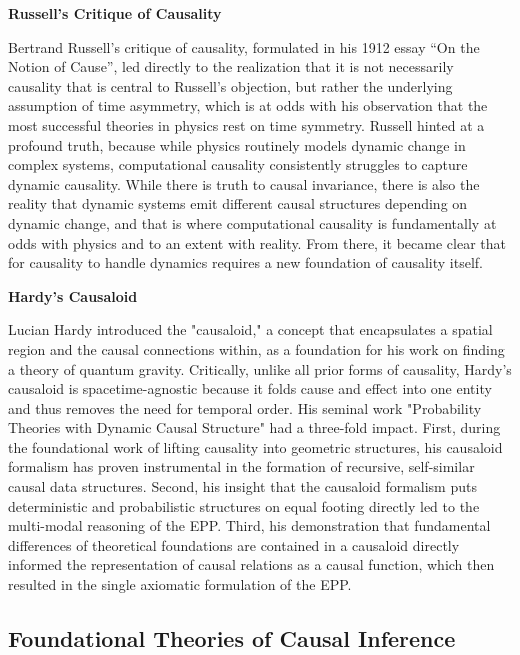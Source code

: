\textbf{Russell's Critique of Causality}

Bertrand Russell's critique of causality, formulated in his 1912 essay ``On the Notion of Cause''\cite{RussellOnCause}, led directly to the realization that it is not necessarily causality that is central to Russell's objection, but rather the underlying assumption of time asymmetry, which is at odds with his observation that the most successful theories in physics rest on time symmetry. Russell hinted at a profound truth, because while physics routinely models dynamic change in complex systems, computational causality consistently struggles to capture dynamic causality. While there is truth to causal invariance, there is also the reality that dynamic systems emit different causal structures depending on dynamic change, and that is where computational causality is fundamentally at odds with physics and to an extent with reality. From there, it became clear that for causality to handle dynamics requires a new foundation of causality itself.

\textbf{Hardy's Causaloid}

Lucian Hardy introduced the "causaloid,"\cite{HardyDynamicCausalStructure} a concept that encapsulates a spatial region and the causal connections within,
as a foundation for his work on finding a theory of quantum gravity. Critically, unlike all prior forms of causality,
Hardy's causaloid is spacetime-agnostic because it folds cause and effect into one entity and thus removes the need for temporal order. His seminal work "Probability Theories with Dynamic Causal Structure" \cite{hardy2005probability} had a three-fold impact.
First, during the foundational work of lifting causality into geometric structures, his causaloid formalism has
proven instrumental in the formation of recursive, self-similar causal data structures.
Second, his insight that the causaloid formalism puts deterministic and probabilistic structures on equal footing directly led to the multi-modal reasoning of the EPP.
Third, his demonstration that fundamental differences of theoretical foundations are contained in a causaloid directly informed the representation of causal relations
as a causal function, which then resulted in the single axiomatic formulation of the EPP.


\subsection{Foundational Theories of Causal Inference}
\label{subsec:foundational_theories}

